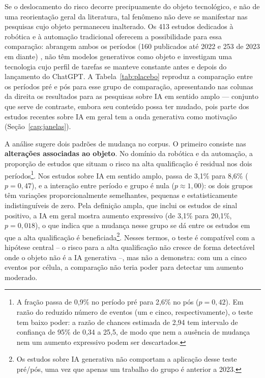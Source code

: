 Se o deslocamento do risco decorre precipuamente do objeto tecnológico, e não de uma reorientação geral da literatura, tal fenômeno não deve se manifestar nas pesquisas cujo objeto permaneceu inalterado. Os 413 estudos dedicados à robótica e à automação tradicional oferecem a possibilidade para essa comparação: abrangem ambos os períodos (160 publicados até 2022 e 253 de 2023 em diante)%
, não têm modelos generativos como objeto e investigam uma tecnologia cujo perfil de tarefas se manteve constante antes e depois do lançamento do ChatGPT. A Tabela~\ref{tab:placebo} reproduz a comparação entre os períodos pré e pós para esse grupo de comparação, apresentando nas colunas da direita os resultados para as pesquisas sobre IA em sentido amplo --- conjunto que serve de contraste, embora seu conteúdo possa ter mudado, pois parte dos estudos recentes sobre IA em geral tem a onda generativa como motivação (Seção~\ref{cap:janelas}).

\begin{table}[htbp]
\centering
\caption{Teste placebo: comparação pré/pós dentro de cada objeto tecnológico.}
\label{tab:placebo}
{\small}
\end{table}

A análise sugere dois padrões de mudança no corpus. O primeiro consiste nas \textbf{alterações associadas ao objeto}. No domínio da robótica e da automação, a proporção de estudos que situam o risco na alta qualificação é residual nos dois períodos\footnote{A fração passa de 0,9\% no período pré para 2,6\% no pós ($p = 0{,}42$). Em razão do reduzido número de eventos (um e cinco, respectivamente), o teste tem baixo poder: a razão de chances estimada de 2,94 tem intervalo de confiança de 95\% de 0,34 a 25,5, de modo que nem a ausência de mudança nem um aumento expressivo podem ser descartados.}. Nos estudos sobre IA em sentido amplo, passa de 3,1\% para 8,6\% ($p = 0{,}47$), e a interação entre período e grupo é nula ($p \approx 1{,}00$): os dois grupos têm variações proporcionalmente semelhantes, pequenas e estatisticamente indistinguíveis de zero. Pela definição ampla, que inclui os estudos de sinal positivo, a IA em geral mostra aumento expressivo (de 3,1\% para 20,1\%, $p = 0{,}018$), o que indica que a mudança nesse grupo se dá entre os estudos em que a alta qualificação é beneficiada\footnote{Os estudos sobre IA generativa não comportam a aplicação desse teste pré/pós, uma vez que apenas um trabalho do grupo é anterior a 2023.}. Nesses termos, o teste é compatível com a hipótese central -- o risco para a alta qualificação não cresce de forma detectável onde o objeto não é a IA generativa --, mas não a demonstra: com um a cinco eventos por célula, a comparação não teria poder para detectar um aumento moderado.


